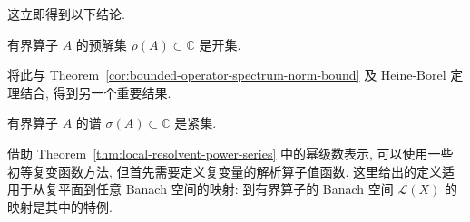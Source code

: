 这立即得到以下结论.

\begin{Corollary}
\label{cor:bounded-operator-resolvent-set-open}
有界算子 $A$ 的预解集 $\rho(A)\subset\mathbb{C}$ 是开集.
\end{Corollary}

将此与 Theorem~\ref{cor:bounded-operator-spectrum-norm-bound} 及 Heine-Borel 定理结合, 得到另一个重要结果.

\begin{Corollary}
\label{cor:bounded-operator-spectrum-compact}
有界算子 $A$ 的谱 $\sigma(A)\subset\mathbb{C}$ 是紧集.
\end{Corollary}

借助 Theorem~\ref{thm:local-resolvent-power-series} 中的幂级数表示, 可以使用一些初等复变函数方法, 但首先需要定义复变量的解析算子值函数. 这里给出的定义适用于从复平面到任意 Banach 空间的映射: 到有界算子的 Banach 空间 $\mathcal{L}(X)$ 的映射是其中的特例.
